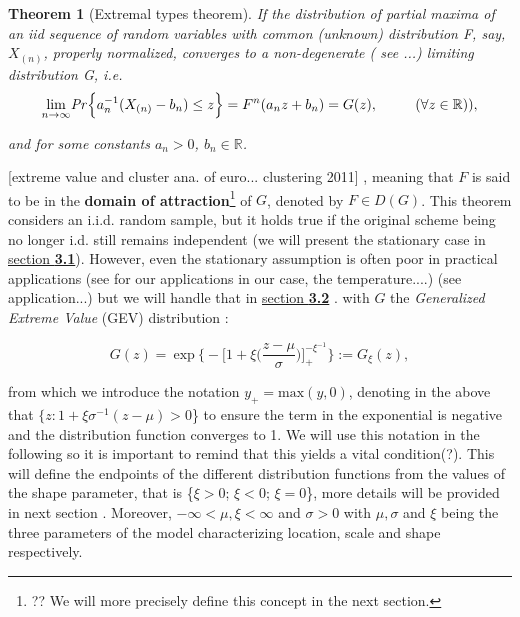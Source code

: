 \documentclass[11pt,a4paper,openany ]{book}
\newtheorem{theorem}{Theorem}[chapter]
\begin{document}
\begin{theorem}[Extremal types theorem] \label{extthm}
	If the distribution of partial maxima of an iid sequence of  random  variables  with  common  (unknown)  distribution F, say, $X_{(n)}$, properly normalized, converges to a non-degenerate ( see ...) limiting distribution G, i.e.
	\begin{equation} \label{exttheom}
	\displaystyle{\lim_{n \to \infty}}\text{\emph{Pr}}\Big\{ a_n^{-1}(X_{(n)}-b_n)\leq z\Big\}=F^n(a_nz+b_n)
	= G(z), \ \ \ \ \ \ \ \ (\forall z\in\mathbb{R})),
	\end{equation}
	
	and for some constants $a_n>0$, $b_n\in\mathbb{R}$.
\end{theorem}
[extreme value and cluster ana. of euro... clustering 2011]
, meaning that $F$ is said to be in the \textbf{domain of attraction}\footnote{?? We will more precisely define this concept in the next section.} of $G$, denoted by $F\in D(G)$.
This theorem considers an i.i.d. random sample, but it holds true if the original scheme 
being no longer i.d. still remains independent (we will present the stationary case in 
\hyperref[statio]{section \textbf{3.1}}). However, even the stationary assumption is often 
poor in practical applications (see for our applications in our case, the temperature....)
\cite{gomes_bootstrap_2015} (see application...) but we will handle that in \hyperref[nstatio]{section \textbf{3.2}} . with $G$ the \textit{Generalized Extreme Value} (GEV) distribution :

\begin{equation} \label{gevgen}
G(z)=\ \text{exp}\ \Bigg\{-\bigg[1+\xi\bigg(\frac{z-\mu}{\sigma}\bigg)\bigg]_+^{-\xi^{-1}}\Bigg\}:=G_{\xi}(z),
\end{equation}

from which we introduce the notation $y_+=\text{max}(y,0)$, denoting in the above that 
$\{z:1+\xi\sigma^{-1}(z-\mu)>0$\} to ensure the term in the exponential is negative and the 
distribution function converges to 1. We will use this notation in the following so it is important to remind that this yields a vital condition(?). This will 
define the endpoints of the different distribution functions from the values of the shape 
parameter, that is \{$\xi>0$; $\xi<0$; $\xi=0$\}, more details will be provided in next 
section . Moreover,  $-\infty<\mu,\xi<\infty$ and $\sigma>0$ with 
$\mu,\sigma$ and $\xi$ being the three parameters of the model characterizing location, 
scale and shape respectively.
\end{document}
